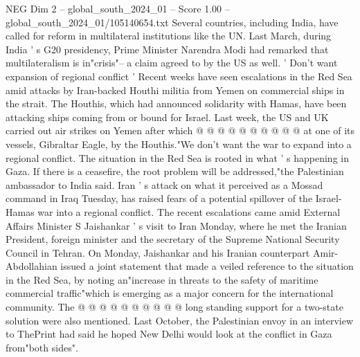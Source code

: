 \begin{textsample}{NEG Dim 2 – global\_south\_2024\_01 – Score 1.00 – global\_south\_2024\_01/105140654.txt}
Several countries, including India, have called for reform in multilateral institutions like the UN.
Last March, during India ' s G20 presidency, Prime Minister Narendra Modi had remarked that multilateralism is in"crisis"-- a claim agreed to by the US as well. ' Don't want expansion of regional conflict ' Recent weeks have seen escalations in the Red Sea amid attacks by Iran-backed Houthi militia from Yemen on commercial ships in the strait.
The Houthis, which had announced solidarity with Hamas, have been attacking ships coming from or bound for Israel.
Last week, the US and UK carried out air strikes on Yemen after which @ @ @ @ @ @ @ @ @ @ at one of its vessels, Gibraltar Eagle, by the Houthis."We don't want the war to expand into a regional conflict.
The situation in the Red Sea is rooted in what ' s happening in Gaza.
If there is a ceasefire, the root problem will be addressed,"the Palestinian ambassador to India said.
Iran ' s attack on what it perceived as a Mossad command in Iraq Tuesday, has raised fears of a potential spillover of the Israel-Hamas war into a regional conflict.
The recent escalations came amid External Affairs Minister S Jaishankar ' s visit to Iran Monday, where he met the Iranian President, foreign minister and the secretary of the Supreme National Security Council in Tehran.
On Monday, Jaishankar and his Iranian counterpart Amir-Abdollahian issued a joint statement that made a veiled reference to the situation in the Red Sea, by noting an"increase in threats to the safety of maritime commercial traffic"which is emerging as a major concern for the international community.
The @ @ @ @ @ @ @ @ @ @ long standing support for a two-state solution were also mentioned.
Last October, the Palestinian envoy in an interview to ThePrint had said he hoped New Delhi would look at the conflict in Gaza from"both sides".

\end{textsample}
